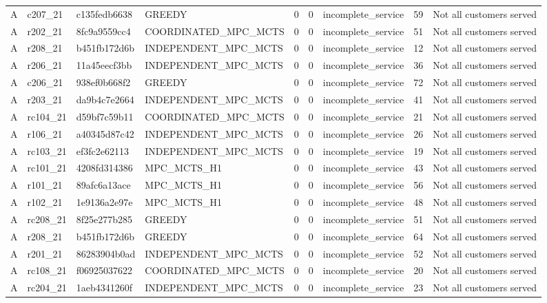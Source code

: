 \begin{table}
{\begin{tabular}{llllrrlrl}
A & c207\_21 & c135fedb6638 & GREEDY & 0 & 0 & incomplete\_service & 59 & Not all customers served \\
A & r202\_21 & 8fc9a9559cc4 & COORDINATED\_MPC\_MCTS & 0 & 0 & incomplete\_service & 51 & Not all customers served \\
A & r208\_21 & b451fb172d6b & INDEPENDENT\_MPC\_MCTS & 0 & 0 & incomplete\_service & 12 & Not all customers served \\
A & r206\_21 & 11a45eecf3bb & INDEPENDENT\_MPC\_MCTS & 0 & 0 & incomplete\_service & 36 & Not all customers served \\
A & c206\_21 & 938ef0b668f2 & GREEDY & 0 & 0 & incomplete\_service & 72 & Not all customers served \\
A & r203\_21 & da9b4c7e2664 & INDEPENDENT\_MPC\_MCTS & 0 & 0 & incomplete\_service & 41 & Not all customers served \\
A & rc104\_21 & d59bf7c59b11 & COORDINATED\_MPC\_MCTS & 0 & 0 & incomplete\_service & 21 & Not all customers served \\
A & r106\_21 & a40345d87c42 & INDEPENDENT\_MPC\_MCTS & 0 & 0 & incomplete\_service & 26 & Not all customers served \\
A & rc103\_21 & ef3fc2e62113 & INDEPENDENT\_MPC\_MCTS & 0 & 0 & incomplete\_service & 19 & Not all customers served \\
A & rc101\_21 & 4208fd314386 & MPC\_MCTS\_H1 & 0 & 0 & incomplete\_service & 43 & Not all customers served \\
A & r101\_21 & 89afc6a13ace & MPC\_MCTS\_H1 & 0 & 0 & incomplete\_service & 56 & Not all customers served \\
A & r102\_21 & 1e9136a2e97e & MPC\_MCTS\_H1 & 0 & 0 & incomplete\_service & 48 & Not all customers served \\
A & rc208\_21 & 8f25e277b285 & GREEDY & 0 & 0 & incomplete\_service & 51 & Not all customers served \\
A & r208\_21 & b451fb172d6b & GREEDY & 0 & 0 & incomplete\_service & 64 & Not all customers served \\
A & r201\_21 & 86283904b0ad & INDEPENDENT\_MPC\_MCTS & 0 & 0 & incomplete\_service & 52 & Not all customers served \\
A & rc108\_21 & f06925037622 & COORDINATED\_MPC\_MCTS & 0 & 0 & incomplete\_service & 20 & Not all customers served \\
A & rc204\_21 & 1aeb4341260f & INDEPENDENT\_MPC\_MCTS & 0 & 0 & incomplete\_service & 23 & Not all customers served \\

\end{tabular}}
\end{table}
